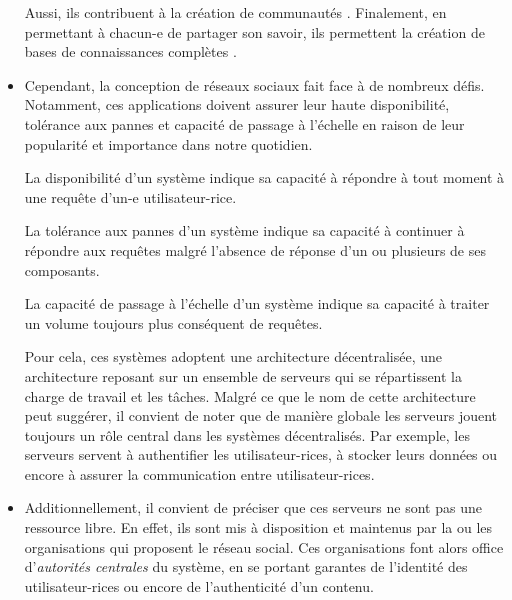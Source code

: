 \begin{itemize}
      Aussi, ils contribuent à la création de communautés \cite{2013-understanding-social-media-logic-van-dijck}.
      Finalement, en permettant à chacun-e de partager son savoir, ils permettent la création de bases de connaissances complètes \cite{2005-internet-encyclopaedias-head-to-head,2008-knowledge-sharing-yahoo-answers-adamic}.
    \item Cependant, la conception de réseaux sociaux fait face à de nombreux défis.
      Notamment, ces applications doivent assurer leur haute disponibilité, tolérance aux pannes et capacité de passage à l'échelle en raison de leur popularité et importance dans notre quotidien.
      \begin{definition}[Disponibilité]
        \label{def:availability}
        La disponibilité d'un système indique sa capacité à répondre à tout moment à une requête d'un-e utilisateur-rice.
      \end{definition}
      \begin{definition}
        La tolérance aux pannes d'un système indique sa capacité à continuer à répondre aux requêtes malgré l'absence de réponse d'un ou plusieurs de ses composants.
      \end{definition}
      \begin{definition}
        La capacité de passage à l'échelle d'un système indique sa capacité à traiter un volume toujours plus conséquent de requêtes.
      \end{definition}
      Pour cela, ces systèmes adoptent une architecture décentralisée\footnotemark, \ie une architecture reposant sur un ensemble de serveurs qui se répartissent la charge de travail et les tâches.
      Malgré ce que le nom de cette architecture peut suggérer, il convient de noter que de manière globale les serveurs jouent toujours un rôle central dans les systèmes décentralisés.
      Par exemple, les serveurs servent à authentifier les utilisateur-rices, à stocker leurs données ou encore à assurer la communication entre utilisateur-rices.
    \item Additionnellement, il convient de préciser que ces serveurs ne sont pas une ressource libre.
      En effet, ils sont mis à disposition et maintenus par la ou les organisations qui proposent le réseau social.
      Ces organisations font alors office d'\emph{autorités centrales} du système, \eg en se portant garantes de l'identité des utilisateur-rices ou encore de l'authenticité d'un contenu.

\end{itemize}
